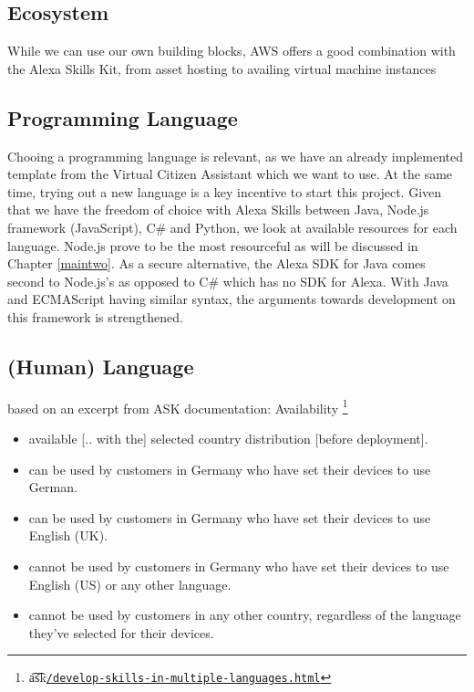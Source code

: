 	
	\subsection*{Ecosystem}
	While we can use our own building blocks, AWS offers a good combination with the Alexa Skills Kit, from asset hosting to availing virtual machine instances 
	
	\subsection*{Programming Language}
	Chooing a programming language is relevant, as we have an already implemented template from the Virtual Citizen Assistant which we want to use. At the same time, trying out a new language is a key incentive to start this project. Given that we have the freedom of choice with Alexa Skills between Java, Node.js framework (JavaScript), C\# and Python, we look at available resources for each language. Node.js prove to be the most resourceful as will be discussed in Chapter \ref{maintwo}. As a secure alternative, the Alexa SDK for Java comes second to Node.js's as opposed to C\# which has no SDK for Alexa. With Java and ECMAScript having similar syntax, the arguments towards development on this framework is strengthened.
	
	\subsection*{(Human) Language}
based on an excerpt from ASK documentation: Availability \footnote{\t{a\t{sk}}\href{https://developer.amazon.com/docs/custom-skills/develop-skills-in-multiple-languages.html}{\lstinline|/develop-skills-in-multiple-languages.html|}}
	
	
	\begin{itemize}
		
		\item {} \space available  [.. with the] selected country distribution [before deployment].
		\item \space[It] can be used by customers in Germany who have set their devices to use German.
		\item \space[It] can be used by customers in Germany who have set their devices to use English (UK).
		\item \space[It] cannot be used by customers in Germany who have set their devices to use English (US) or any other language.
		\item \space [It] cannot be used by customers in any other country, regardless of the language they've selected for their devices.
		
	\end{itemize}
	
